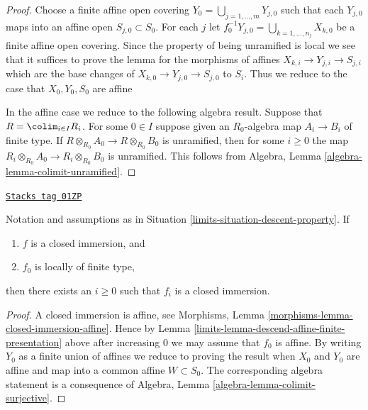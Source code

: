 \begin{proof}
Choose a finite affine open covering
$Y_0 = \bigcup_{j = 1, \ldots, m} Y_{j, 0}$
such that each $Y_{j, 0}$ maps into an affine open
$S_{j, 0} \subset S_0$. For each $j$ let
$f_0^{-1}Y_{j, 0} = \bigcup_{k = 1, \ldots, n_j} X_{k, 0}$ be a
finite affine open covering. Since the property of being unramified is
local we see that it suffices to prove the lemma for the morphisms
of affines $X_{k, i} \to Y_{j, i} \to S_{j, i}$ which are the base
changes of $X_{k, 0} \to Y_{j, 0} \to S_{j, 0}$ to $S_i$.
Thus we reduce to the case that $X_0, Y_0, S_0$ are affine

\medskip\noindent
In the affine case we reduce to the following algebra result.
Suppose that $R = \colim_{i \in I} R_i$. For some $0 \in I$
suppose given an $R_0$-algebra map $A_i \to B_i$ of finite type.
If $R \otimes_{R_0} A_0 \to R \otimes_{R_0} B_0$ is unramified, then
for some $i \geq 0$ the map
$R_i \otimes_{R_0} A_0 \to R_i \otimes_{R_0} B_0$ is unramified.
This follows from Algebra,
Lemma \ref{algebra-lemma-colimit-unramified}.
\end{proof}

\begin{lemma}
\label{limits-lemma-descend-closed-immersion-finite-presentation}
\href{https://stacks.math.columbia.edu/tag/01ZP}{\texttt{Stacks tag 01ZP}}

Notation and assumptions as in Situation \ref{limits-situation-descent-property}.
If
\begin{enumerate}
\item $f$ is a closed immersion, and
\item $f_0$ is locally of finite type,
\end{enumerate}
then there exists an $i \geq 0$ such that $f_i$ is a closed immersion.
\end{lemma}

\begin{proof}

A closed immersion is affine, see
Morphisms, Lemma \ref{morphisms-lemma-closed-immersion-affine}.
Hence by Lemma \ref{limits-lemma-descend-affine-finite-presentation} above
after increasing $0$ we may assume that $f_0$ is affine.
By writing $Y_0$ as a finite union of affines we reduce to proving
the result when $X_0$ and $Y_0$ are affine and map
into a common affine $W \subset S_0$. The corresponding algebra
statement is a consequence of
Algebra, Lemma \ref{algebra-lemma-colimit-surjective}.
\end{proof}

